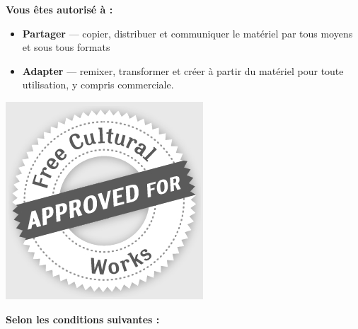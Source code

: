 \documentclass{KBook}
\begin{document}
\begin{tcolorbox}[colback=my-grey,
	colframe=my-grey,  
	center, arc=0pt,outer arc=0pt,
	valign=top, 
	halign=left,
	width=\textwidth]
	
	
	
	\begin{center}
		\bfseries\Large
		Vous êtes autorisé à :
	\end{center}
	
	\begin{minipage}{0.83\textwidth}
		\begin{itemize}
			\item[] \textbf{Partager} — copier, distribuer et communiquer le matériel par tous moyens et sous tous formats
			\item[] \textbf{Adapter} — remixer, transformer et créer à partir du matériel
			pour toute utilisation, y compris commerciale.
		\end{itemize}
	\end{minipage}
	\begin{minipage}{0.15\textwidth}
		\includegraphics[width=\textwidth]{../img/licence/FreeCulturalWorks_seal_x2.jpg}
	\end{minipage}
	
	
	\begin{center}
		\bfseries\Large
		Selon les conditions suivantes :
	\end{center}
	

\end{tcolorbox}
\end{document}
